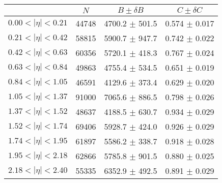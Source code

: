 \begin{tabular}{lccc}
\hline
    &   $N$   & $B \pm \delta B$  &  $C \pm \delta C$ \\
\hline
$0.00 < |\eta| <0.21$          & 44748      & 4700.2     $\pm$ 501.5 & 0.574      $\pm$ 0.017 \\
$0.21 < |\eta| <0.42$          & 58815      & 5900.7     $\pm$ 947.7 & 0.742      $\pm$ 0.022 \\
$0.42 < |\eta| <0.63$          & 60356      & 5720.1     $\pm$ 418.3 & 0.767      $\pm$ 0.024 \\
$0.63 < |\eta| <0.84$          & 49863      & 4755.4     $\pm$ 534.5 & 0.651      $\pm$ 0.019 \\
$0.84 < |\eta| <1.05$          & 46591      & 4129.6     $\pm$ 373.4 & 0.629      $\pm$ 0.020 \\
$1.05 < |\eta| <1.37$          & 91000      & 7065.6     $\pm$ 886.5 & 0.798      $\pm$ 0.026 \\
$1.37 < |\eta| <1.52$          & 48637      & 4188.5     $\pm$ 630.7 & 0.934      $\pm$ 0.029 \\
$1.52 < |\eta| <1.74$          & 69406      & 5928.7     $\pm$ 424.0 & 0.926      $\pm$ 0.029 \\
$1.74 < |\eta| <1.95$          & 61897      & 5586.2     $\pm$ 338.7 & 0.918      $\pm$ 0.028 \\
$1.95 < |\eta| <2.18$          & 62866      & 5785.8     $\pm$ 901.5 & 0.880      $\pm$ 0.025 \\
$2.18 < |\eta| <2.40$          & 55335      & 6352.9     $\pm$ 492.5 & 0.891      $\pm$ 0.029 \\
\hline
\end{tabular}
